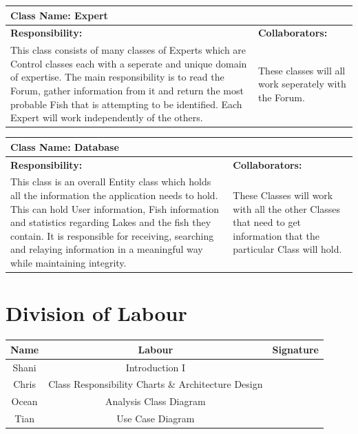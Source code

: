 \documentclass[]{article}
\begin{document}
	\begin{table}[ht]
		\centering
		\begin{tabular}{|p{5cm}|p{5cm}|}
		\hline
		 \multicolumn{2}{|l|}{\textbf{Class Name: Expert}} \\
		\hline
		\textbf{Responsibility:} & \textbf{Collaborators:} \\ \hline
		This class consists of many classes of Experts which are Control classes each with a seperate and unique domain of expertise. The main responsibility is to read the Forum, gather information from it and return the most probable Fish that is attempting to be identified. Each Expert will work independently of the others. & These classes will all work seperately with the Forum. \\
		\hline
		\end{tabular}
	\end{table}

	\begin{table}[ht]
		\centering
		\begin{tabular}{|p{5cm}|p{5cm}|}
		\hline
		 \multicolumn{2}{|l|}{\textbf{Class Name: Database}} \\
		\hline
		\textbf{Responsibility:} & \textbf{Collaborators:} \\
		\hline
		This class is an overall Entity class which holds all the information the application needs to hold. This can hold User information, Fish information and statistics regarding Lakes and the fish they contain. It is responsible for receiving, searching and relaying information in a meaningful way while maintaining integrity. & These Classes will work with all the other Classes that need to get information that the particular Class will hold. \\
		\hline
		\end{tabular}
	\end{table}

\FloatBarrier

\appendix
\section{Division of Labour}
\label{sec:division_of_labour}
\begin{center}
\begin{tabular}{ |c|c|c| }
 \hline
 Name & Labour & Signature              \\ \hline
 Shani & Introduction I & \\
 Chris & Class Responsibility Charts \& Architecture Design &  \\
 Ocean & Analysis Class Diagram &  \\
 Tian & Use Case Diagram & \\
 \hline
\end{tabular}
\end{center}

\newpage

\listoffigures
\end{document}
